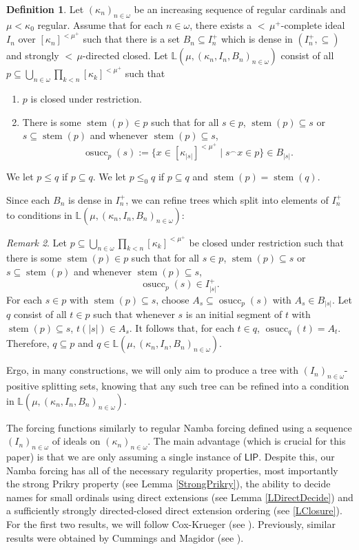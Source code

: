 \documentclass[a4paper]{amsart}
\theoremstyle{definition}
\newtheorem{mydef}{Definition}[section]
\theoremstyle{remark}
\newtheorem{mybem}[mydef]{Remark}
\theoremstyle{plain}
\numberwithin{mydef}{section}
\DeclareMathOperator{\stem}{stem}
\DeclareMathOperator{\osucc}{osucc}
\newcommand{\dL}{\mathbb{L}}
\newcommand{\LIP}{\mathsf{LIP}}
\begin{document}
	\begin{mydef}
		Let $(\kappa_n)_{n\in\omega}$ be an increasing sequence of regular cardinals and $\mu<\kappa_0$ regular. Assume that for each $n\in\omega$, there exists a ${<}\,\mu^+$-complete ideal $I_n$ over $[\kappa_n]^{<\mu^+}$ such that there is a set $B_n\subseteq I_n^+$ which is dense in $(I_n^+,\subseteq)$ and strongly ${<}\,\mu$-directed closed. Let $\dL(\mu,(\kappa_n,I_n,B_n)_{n\in\omega})$ consist of all $p\subseteq\bigcup_{n\in\omega}\prod_{k<n}[\kappa_k]^{<\mu^+}$ such that
		\begin{enumerate}
			\item $p$ is closed under restriction.
			\item There is some $\stem(p)\in p$ such that for all $s\in p$, $\stem(p)\subseteq s$ or $s\subseteq\stem(p)$ and whenever $\stem(p)\subseteq s$,
			$$\osucc_p(s):=\{x\in[\kappa_{|s|}]^{<\mu^+}\;|\;s^{\frown}x\in p\}\in B_{|s|}.$$
		\end{enumerate}
		We let $p\leq q$ if $p\subseteq q$. We let $p\leq_0q$ if $p\subseteq q$ and $\stem(p)=\stem(q)$.
	\end{mydef}
	
	Since each $B_n$ is dense in $I_n^+$, we can refine trees which split into elements of $I_n^+$ to conditions in $\dL(\mu,(\kappa_n,I_n,B_n)_{n\in\omega})$:
	
	\begin{mybem}
		Let $p\subseteq\bigcup_{n\in\omega}\prod_{k<n}[\kappa_k]^{<\mu^+}$ be closed under restriction such that there is some $\stem(p)\in p$ such that for all $s\in p$, $\stem(p)\subseteq s$ or $s\subseteq\stem(p)$ and whenever $\stem(p)\subseteq s$,
		$$\osucc_p(s)\in I_{|s|}^+.$$
		For each $s\in p$ with $\stem(p)\subseteq s$, choose $A_s\subseteq\osucc_p(s)$ with $A_s\in B_{|s|}$. Let $q$ consist of all $t\in p$ such that whenever $s$ is an initial segment of $t$ with $\stem(p)\subseteq s$, $t(|s|)\in A_s$. It follows that, for each $t\in q$, $\osucc_q(t)=A_t$. Therefore, $q\subseteq p$ and $q\in\dL(\mu,(\kappa_n,I_n,B_n)_{n\in\omega})$.
	\end{mybem}
	
	Ergo, in many constructions, we will only aim to produce a tree with $(I_n)_{n\in\omega}$-positive splitting sets, knowing that any such tree can be refined into a condition in $\dL(\mu,(\kappa_n,I_n,B_n)_{n\in\omega})$.
	
	The forcing functions similarly to regular Namba forcing defined using a sequence $(I_n)_{n\in\omega}$ of ideals on $(\kappa_n)_{n\in\omega}$. The main advantage (which is crucial for this paper) is that we are only assuming a single instance of $\LIP$. Despite this, our Namba forcing has all of the necessary regularity properties, most importantly the strong Prikry property (see Lemma \ref{StrongPrikry}), the ability to decide names for small ordinals using direct extensions (see Lemma \ref{LDirectDecide}) and a sufficiently strongly directed-closed direct extension ordering (see \ref{LClosure}). For the first two results, we will follow Cox-Krueger (see \cite{CoxKruegerNamba}). Previously, similar results were obtained by Cummings and Magidor (see \cite{CumMagMMWeakSquare}).
	
\end{document}

